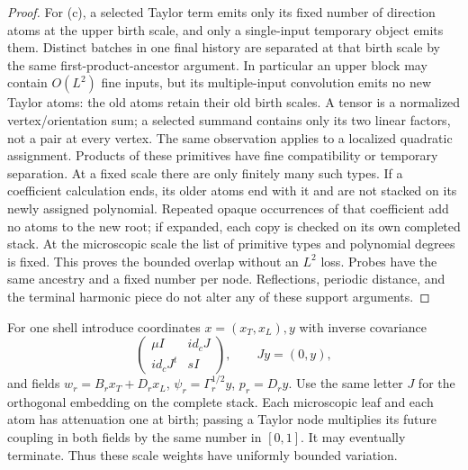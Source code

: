 \begin{proof}
For (c), a selected Taylor term emits only its fixed number of direction
atoms at the upper birth scale, and only a single-input temporary object
emits them. Distinct batches in one final history are separated at that
birth scale by the same first-product-ancestor argument. In particular
an upper block may contain $O(L^2)$ fine inputs, but its multiple-input
convolution emits no new Taylor atoms: the old atoms retain their old
birth scales. A tensor is a normalized vertex/orientation sum; a selected
summand contains only its two linear factors, not a pair at every vertex.
The same observation applies to a localized quadratic assignment.
Products of these primitives have fine compatibility or temporary
separation. At a fixed scale there are only finitely many such types.
If a coefficient calculation ends, its older atoms end with it and are
not stacked on its newly assigned polynomial. Repeated opaque occurrences
of that coefficient add no atoms to the new root; if expanded, each copy
is checked on its own completed stack. At the microscopic scale
the list of primitive types and polynomial degrees is fixed. This proves
the bounded overlap without an $L^2$ loss. Probes have the same ancestry
and a fixed number per node. Reflections, periodic distance, and the
terminal harmonic piece do not alter any of these support arguments.
\end{proof}

For one shell introduce coordinates $x=(x_T,x_L),y$ with inverse
covariance
\[
 \begin{pmatrix}\mu I&i d_cJ\\i d_cJ^t&sI\end{pmatrix},
 \qquad Jy=(0,y),
\]
and fields $w_r=B_rx_T+D_rx_L$, $\psi_r=\Gamma_r^{1/2}y$,
$p_r=D_ry$. Use the same letter $J$ for the orthogonal embedding on the
complete stack. Each microscopic leaf and each atom has attenuation
one at birth; passing a Taylor node multiplies its future coupling in
both fields by the same number in $[0,1]$. It may eventually terminate.
Thus these scale weights have uniformly bounded variation.

